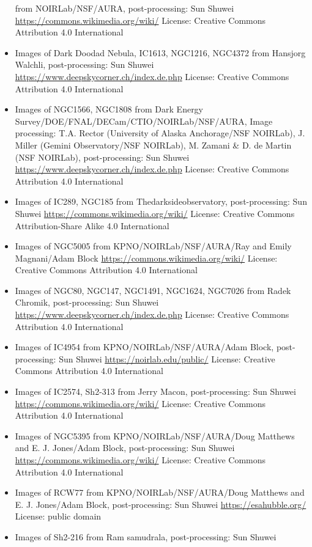 \begin{itemize}
	 from NOIRLab/NSF/AURA, post-processing: Sun Shuwei 
	 \url{https://commons.wikimedia.org/wiki/}
	 License: Creative Commons Attribution 4.0 International
\item Images of Dark Doodad Nebula, IC1613, NGC1216, NGC4372
	 from Hansjorg Walchli, post-processing: Sun Shuwei
	 \url{https://www.deepskycorner.ch/index.de.php}
	 License: Creative Commons Attribution 4.0 International
\item Images of NGC1566, NGC1808
	 from Dark Energy Survey/DOE/FNAL/DECam/CTIO/NOIRLab/NSF/AURA, Image processing: T.A. Rector (University of Alaska Anchorage/NSF NOIRLab), J. Miller (Gemini Observatory/NSF NOIRLab), M. Zamani \& D. de Martin (NSF NOIRLab), post-processing: Sun Shuwei
	 \url{https://www.deepskycorner.ch/index.de.php}
	 License: Creative Commons Attribution 4.0 International
\item Images of IC289, NGC185
	 from Thedarksideobservatory, post-processing: Sun Shuwei
	 \url{https://commons.wikimedia.org/wiki/}
	 License: Creative Commons Attribution-Share Alike 4.0 International
\item Images of NGC5005
	 from KPNO/NOIRLab/NSF/AURA/Ray and Emily Magnani/Adam Block
	 \url{https://commons.wikimedia.org/wiki/}
	 License: Creative Commons Attribution 4.0 International
\item Images of NGC80, NGC147, NGC1491, NGC1624, NGC7026
	 from Radek Chromik, post-processing: Sun Shuwei
	 \url{https://www.deepskycorner.ch/index.de.php}
	 License: Creative Commons Attribution 4.0 International
\item Images of IC4954
	 from KPNO/NOIRLab/NSF/AURA/Adam Block, post-processing: Sun Shuwei
	 \url{https://noirlab.edu/public/}
	 License: Creative Commons Attribution 4.0 International
\item Images of IC2574, Sh2-313
	 from Jerry Macon, post-processing: Sun Shuwei
	 \url{https://commons.wikimedia.org/wiki/}
	 License: Creative Commons Attribution 4.0 International
\item Images of NGC5395
	 from KPNO/NOIRLab/NSF/AURA/Doug Matthews and E. J. Jones/Adam Block, post-processing: Sun Shuwei
	 \url{https://commons.wikimedia.org/wiki/}
	 License: Creative Commons Attribution 4.0 International
\item Images of RCW77
	 from KPNO/NOIRLab/NSF/AURA/Doug Matthews and E. J. Jones/Adam Block, post-processing: Sun Shuwei
	 \url{https://esahubble.org/}
	 License: public domain
\item Images of Sh2-216
	 from Ram samudrala, post-processing: Sun Shuwei

\end{itemize}
